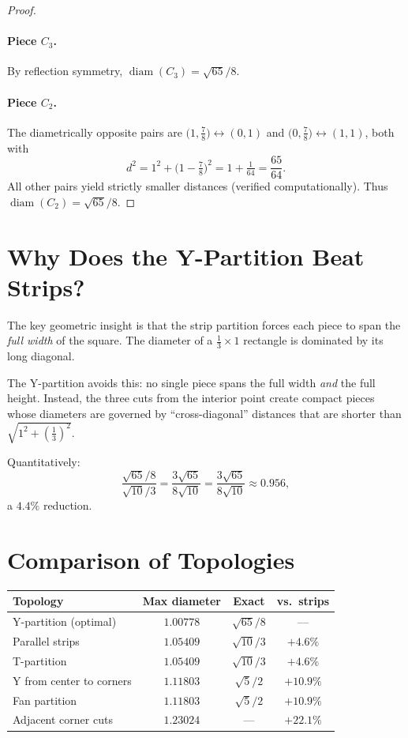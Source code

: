 \documentclass[11pt]{article}
\theoremstyle{definition}
\begin{document}
\begin{proof}
\paragraph{Piece $C_3$.}
By reflection symmetry, $\operatorname{diam}(C_3) = \sqrt{65}/8$.

\paragraph{Piece $C_2$.}
The diametrically opposite pairs are
$\bigl(1,\tfrac{7}{8}\bigr) \leftrightarrow (0,1)$ and
$\bigl(0,\tfrac{7}{8}\bigr) \leftrightarrow (1,1)$, both with
\[
  d^2 = 1^2 + \bigl(1 - \tfrac{7}{8}\bigr)^2 = 1 + \tfrac{1}{64} = \frac{65}{64}.
\]
All other pairs yield strictly smaller distances (verified
computationally). Thus $\operatorname{diam}(C_2) = \sqrt{65}/8$.
\end{proof}

\section{Why Does the Y-Partition Beat Strips?}

The key geometric insight is that the strip partition forces each piece
to span the \emph{full width} of the square. The diameter of a
$\tfrac{1}{3}\times 1$ rectangle is dominated by its long diagonal.

The Y-partition avoids this: no single piece spans the full width
\emph{and} the full height. Instead, the three cuts from the interior
point create compact pieces whose diameters are governed by
``cross-diagonal'' distances that are shorter than $\sqrt{1^2 +
(\frac{1}{3})^2}$.

Quantitatively:
\[
  \frac{\sqrt{65}/8}{\sqrt{10}/3}
  = \frac{3\sqrt{65}}{8\sqrt{10}}
  = \frac{3\sqrt{65}}{8\sqrt{10}} \approx 0.956,
\]
a $4.4\%$ reduction.

\section{Comparison of Topologies}

\begin{center}
\renewcommand{\arraystretch}{1.3}
\begin{tabular}{lccc}
\toprule
\textbf{Topology} & \textbf{Max diameter} & \textbf{Exact} & \textbf{vs.\ strips} \\
\midrule
Y-partition (optimal) & $1.00778$ & $\sqrt{65}/8$ & --- \\
Parallel strips & $1.05409$ & $\sqrt{10}/3$ & $+4.6\%$ \\
T-partition & $1.05409$ & $\sqrt{10}/3$ & $+4.6\%$ \\
Y from center to corners & $1.11803$ & $\sqrt{5}/2$ & $+10.9\%$ \\
Fan partition & $1.11803$ & $\sqrt{5}/2$ & $+10.9\%$ \\
Adjacent corner cuts & $1.23024$ & --- & $+22.1\%$ \\
\bottomrule
\end{tabular}
\end{center}
\end{document}
